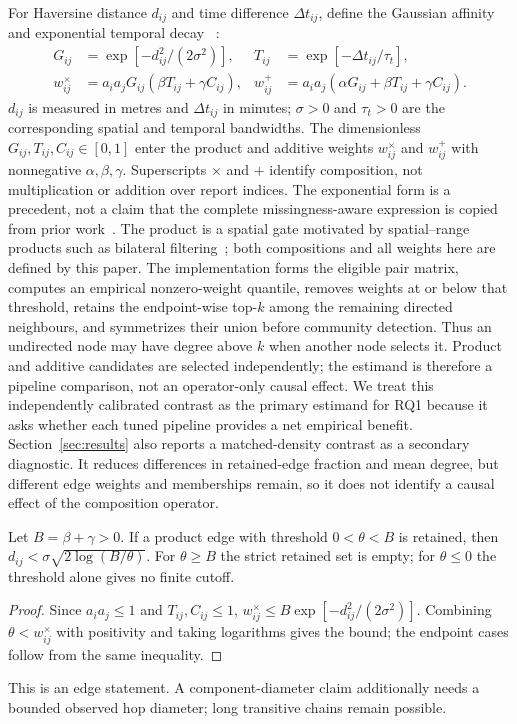 \documentclass[runningheads]{llncs}
\begin{document}
For Haversine distance $d_{ij}$ and time difference $\Delta t_{ij}$, define
the Gaussian affinity~\cite{ng2001spectral} and exponential temporal decay
~\cite{zhou2013triggering}:
\begin{align}
G_{ij}&=\exp[-d_{ij}^{2}/(2\sigma^2)],&
T_{ij}&=\exp[-\Delta t_{ij}/\tau_t],\nonumber\\
w^\times_{ij}&=a_i a_jG_{ij}(\beta T_{ij}+\gamma C_{ij}),&
w^+_{ij}&=a_i a_j(\alpha G_{ij}+\beta T_{ij}+\gamma C_{ij}).
\label{eq:similarities}
\end{align}
$d_{ij}$ is measured in metres and $\Delta t_{ij}$ in minutes;
$\sigma>0$ and $\tau_t>0$ are the corresponding spatial and temporal
bandwidths. The dimensionless $G_{ij},T_{ij},C_{ij}\in[0,1]$ enter the product
and additive weights $w^\times_{ij}$ and $w^+_{ij}$ with nonnegative
$\alpha,\beta,\gamma$. Superscripts $\times$ and $+$ identify composition,
not multiplication or addition over report indices.
The exponential form is a precedent, not a claim that the complete
missingness-aware expression is copied from prior work~\cite{billot2008exponential}.
The product is a spatial gate motivated by spatial--range products such as
bilateral filtering~\cite{tomasi1998bilateral}; both compositions and all
weights here are defined by this paper.
The implementation forms the eligible pair matrix,
computes an empirical nonzero-weight quantile, removes weights at or below
that threshold, retains the endpoint-wise top-$k$ among the remaining directed
neighbours, and symmetrizes their union before community detection. Thus an
undirected node may have degree above $k$ when another node selects it.
Product and additive candidates are selected independently; the estimand is
therefore a pipeline comparison, not an operator-only causal effect. We treat
this independently calibrated contrast as the primary estimand for RQ1
because it asks whether each tuned pipeline provides a net empirical benefit.
Section~\ref{sec:results} also reports a matched-density contrast as a
secondary diagnostic. It reduces differences in retained-edge fraction and
mean degree, but different edge weights and memberships remain, so it does not
identify a causal effect of the composition operator.

\begin{theorem}
Let $B=\beta+\gamma>0$. If a product edge with threshold $0<\theta<B$ is
retained, then
$d_{ij}<\sigma\sqrt{2\log(B/\theta)}$. For $\theta\ge B$ the strict retained
set is empty; for $\theta\le0$ the threshold alone gives no finite cutoff.
\end{theorem}
\begin{proof}
Since $a_ia_j\le1$ and $T_{ij},C_{ij}\le1$,
$w^\times_{ij}\le B\exp[-d_{ij}^{2}/(2\sigma^2)]$. Combining
$\theta<w^\times_{ij}$ with positivity and taking logarithms gives the bound;
the endpoint cases follow from the same inequality.
\end{proof}
This is an edge statement. A component-diameter claim additionally needs a
bounded observed hop diameter; long transitive chains remain possible.
\end{document}

